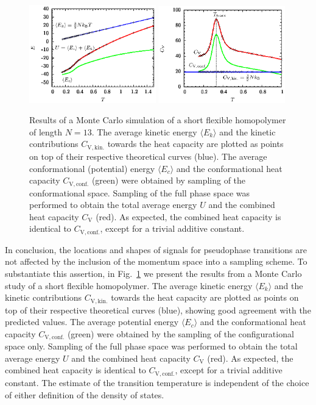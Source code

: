 \documentclass[12pt]{report}
\begin{document}
\begin{figure}
\center
\includegraphics[width = 0.49\textwidth]{chapter2Figs/N13Energy.eps}
\includegraphics[width = 0.49\textwidth]{chapter2Figs/N13Spec.eps}
\caption{\label{fig:Fig_6}%
Results of a Monte Carlo simulation of a short flexible homopolymer of length $N=13$. The average kinetic energy $\langle E _{k}\rangle$ and the kinetic contributions $C_{\mathrm{V,kin.}}$ towards the heat capacity are plotted as points on top of their respective theoretical curves (blue). The average conformational (potential) energy $\langle E_{c} \rangle$ and the conformational heat capacity $C_{\mathrm{V},\mathrm{conf.}}$ (green) were obtained by sampling of the conformational space. Sampling of the full phase space was performed to obtain the total average energy $U$ and the combined heat capacity $C_{\mathrm{V}}$ (red). As expected, the combined heat capacity is identical to $C_{\mathrm{V},\mathrm{conf.}}$, except for a trivial additive constant.}
\end{figure}

In conclusion, the locations and shapes of signals for pseudophase transitions are not affected by the inclusion of the momentum space into a sampling scheme. To substantiate this assertion, in Fig.~\ref{fig:Fig_6} we present the results from a Monte Carlo study of a short flexible homopolymer. The average kinetic energy $\langle E _{k}\rangle$ and the kinetic contributions $C_{\mathrm{V,kin.}}$ towards the heat capacity are plotted as points on top of their respective theoretical curves (blue), showing good agreement with the predicted values. The average potential energy $\langle E_{c} \rangle$ and the conformational heat capacity $C_{\mathrm{V},\mathrm{conf.}}$ (green) were obtained by the sampling of the configurational space only. Sampling of the full phase space was performed to obtain the total average energy $U$ and the combined heat capacity $C_{\mathrm{V}}$ (red). As expected, the combined heat capacity is identical to $C_{\mathrm{V},\mathrm{conf.}}$, except for a trivial additive constant. The estimate of the transition temperature is independent of the choice of either definition of the density of states. 
\newpage 
\end{document}

